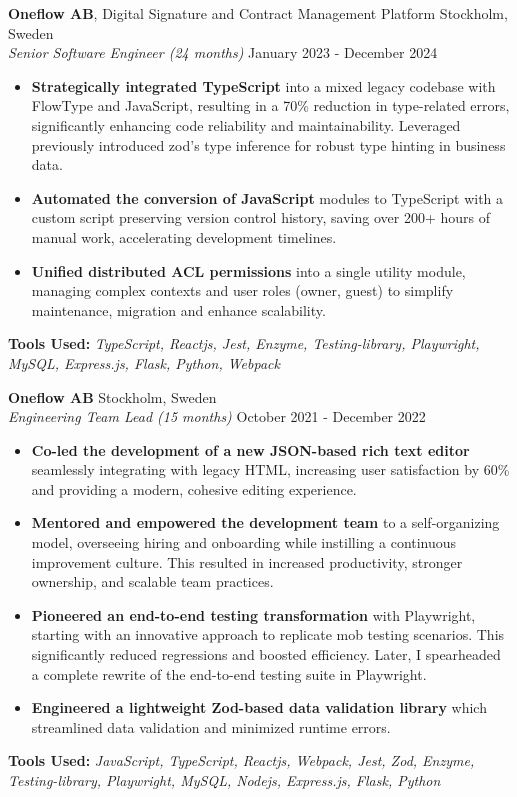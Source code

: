 \begin{minipage}[t]{0.61\textwidth}
\Large
\noindent
\textbf{\Large Oneflow AB}, Digital Signature and Contract Management Platform \hfill Stockholm, Sweden\\ %
\textit{Senior Software Engineer (24 months)} \hfill January 2023 - December 2024 %
\begin{itemize}
\setlength{\itemsep}{0.5em}
    \item \textbf{Strategically integrated TypeScript} into a mixed legacy codebase with FlowType and JavaScript, resulting in a 70\% reduction in type-related errors, significantly enhancing code reliability and maintainability.
    Leveraged previously introduced zod's type inference for robust type hinting in business data.
    \item \textbf{Automated the conversion of JavaScript} modules to TypeScript with a custom script preserving version control history, saving over 200+ hours of manual work, accelerating development timelines.
    \item \textbf{Unified distributed ACL permissions} into a single utility module, managing complex contexts and user roles (owner, guest) to simplify maintenance, migration and enhance scalability.
\end{itemize}
\vspace{1em}
\textbf{Tools Used:} \textit{TypeScript, Reactjs, Jest, Enzyme, Testing-library, Playwright, MySQL, Express.js, Flask, Python, Webpack}

\vspace{1.5em}

\noindent
\textbf{Oneflow AB} \hfill Stockholm, Sweden\\
\textit{Engineering Team Lead (15 months)} \hfill October 2021 - December 2022 %
\begin{itemize}
\setlength{\itemsep}{0.5em}
    \item \textbf{Co-led the development of a new JSON-based rich text editor} seamlessly integrating with legacy HTML, increasing user satisfaction by 60\% and providing a modern, cohesive editing experience.
    \item \textbf{Mentored and empowered the development team} to a self-organizing model, overseeing hiring and onboarding while instilling a continuous improvement culture. This resulted in increased productivity, stronger ownership, and scalable team practices.
    \item \textbf{Pioneered an end-to-end testing transformation} with Playwright, starting with an innovative approach to replicate mob testing scenarios. This significantly reduced regressions and boosted efficiency.
    Later, I spearheaded a complete rewrite of the end-to-end testing suite in Playwright.
    \item \textbf{Engineered a lightweight Zod-based data validation library} which streamlined data validation and minimized runtime errors.
\end{itemize}

\vspace{1em}

\textbf{Tools Used:} \textit{JavaScript, TypeScript, Reactjs, Webpack, Jest, Zod, Enzyme, Testing-library, Playwright, MySQL, Nodejs, Express.js, Flask, Python}

\end{minipage}
